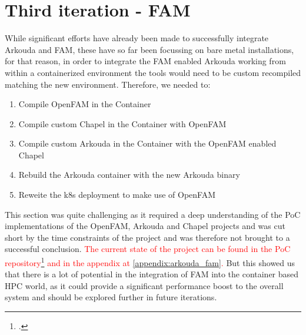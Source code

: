 \section*{Third iteration - \ac{FAM}}
\label{third_iteration_fam}
While significant efforts have already been made to successfully integrate Arkouda and \ac{FAM}, these have so far been focussing on bare metal installations, for that reason, in order to integrate the \ac{FAM} enabled Arkouda working from within a containerized environment the tools would need to be 
custom recompiled matching the new environment. 
Therefore, we needed to:

\begin{enumerate}
    \item Compile OpenFAM in the Container
    \item Compile custom Chapel in the Container with OpenFAM
    \item Compile custom Arkouda in the Container with the OpenFAM enabled Chapel
    \item Rebuild the Arkouda container with the new Arkouda binary
    \item Reweite the \ac{k8s} deployment to make use of OpenFAM
\end{enumerate}

This section was quite challenging as it required a deep understanding of the \ac{PoC} implementations of the OpenFAM, Arkouda and Chapel projects and was cut short by the time constraints of the project and was therefore not brought to a successful conclusion.
\textcolor{red}{The current state of the project can be found in the \ac{PoC} repository\footcite{eckerthPoCRepository2023} and in the appendix at \ref{appendix:arkouda_fam}. 
}
But this showed us that there is a lot of potential in the integration of \ac{FAM} into the container based \ac{HPC} world, as it could provide a significant performance boost to the overall system and should be explored further in future iterations.

